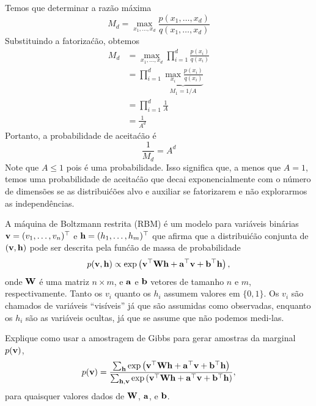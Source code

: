 \begin{exenumerate}
    \begin{solution}
        Temos que determinar a raz\~ao m\'axima
        \begin{equation}
            M_d = \max_{x_1, \ldots, x_d} \frac{p(x_1, \ldots, x_d)}{q(x_1, \ldots, x_d)}
        \end{equation}
        Substituindo a fatoriza\'c\~ao, obtemos
        \begin{align}
            M_d &= \max_{x_1, \ldots, x_d} \prod_{i=1}^d \frac{p(x_i)}{q(x_i)}\\
            & = \prod_{i=1}^d \underbrace{\max_{x_i} \frac{p(x_i)}{q(x_i)}}_{M_1 = 1/A}\\
            & = \prod_{i=1}^d \frac{1}{A}\\
            & = \frac{1}{A^d}
        \end{align}
        Portanto, a probabilidade de aceita\'c\~ao \'e
        \begin{equation}
            \frac{1}{M_d} = A^d
        \end{equation}
        Note que $A \le 1$ pois \'e uma probabilidade. Isso significa que, a menos que $A=1$,
        temos uma probabilidade de aceita\'c\~ao que decai exponencialmente com o
        n\'umero de dimens\~oes se as distribui\'c\~oes alvo e auxiliar
        se fatorizarem e n\~ao explorarmos as independ\^encias.
    \end{solution}
\end{exenumerate}



A m\'aquina de Boltzmann restrita (RBM) \'e um modelo para vari\'aveis bin\'arias
$\mathbf{v} =(v_1, \ldots, v_n)^\top$ e $\mathbf{h}=(h_1, \ldots, h_m)^\top$ que
afirma que a distribui\'c\~ao conjunta de $(\mathbf{v},\mathbf{h})$ pode ser descrita pela
fun\'c\~ao de massa de probabilidade
\begin{equation}
    p(\mathbf{v},\mathbf{h}) \propto \exp\left( \mathbf{v}^\top \mathbf{W} \mathbf{h} + \mathbf{a}^\top\mathbf{v} + \mathbf{b}^\top\mathbf{h} \right),
\end{equation}
onde $\mathbf{W}$ \'e uma matriz $n \times m$, e $\mathbf{a}$ e $\mathbf{b}$ vetores de tamanho
$n$ e $m$, respectivamente. Tanto os $v_i$ quanto os $h_i$ assumem
valores em $\{0,1\}$. Os $v_i$ s\~ao chamados de vari\'aveis ``vis\'iveis''
j\'a que s\~ao assumidas como observadas, enquanto os $h_i$ s\~ao as vari\'aveis ocultas,
j\'a que se assume que n\~ao podemos medi-las.

Explique como usar a amostragem de Gibbs para gerar amostras da
marginal $p(\mathbf{v})$,
\begin{equation}
    p(\mathbf{v}) = \frac{\sum_{\mathbf{h}}  \exp\left( \mathbf{v}^\top \mathbf{W} \mathbf{h} + \mathbf{a}^\top\mathbf{v} + \mathbf{b}^\top\mathbf{h} \right)}{\sum_{\mathbf{h}, \mathbf{v}}  \exp\left( \mathbf{v}^\top \mathbf{W} \mathbf{h} + \mathbf{a}^\top\mathbf{v} + \mathbf{b}^\top\mathbf{h} \right)},
\end{equation}
para quaisquer valores dados de $\mathbf{W}$, $\mathbf{a}$, e $\mathbf{b}$.

